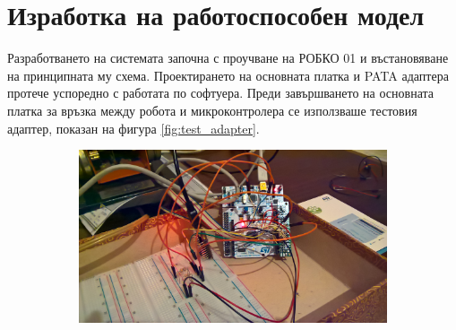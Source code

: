 \chapter{Изработка на работоспособен модел}
\indent{}
Разработването на системата започна с проучване на РОБКО 01 и въстановяване на принципната му схема. Проектирането на основната платка и PATA адаптера протече успоредно с работата по софтуера. Преди завършването на основната платка за връзка между робота и микроконтролера се използваше тестовия адаптер, показан на фигура \ref{fig:test_adapter}.\\
\begin{figure}[!h]
    \centering
    \begin{subfigure}{0.48\textwidth}
        \centering
        \includegraphics[width=\linewidth]{pictures/test_adapter_1.jpg}
    \end{subfigure}
    \hfill%
    \begin{subfigure}{0.48\textwidth}
        \centering

\end{subfigure}
\end{figure}
